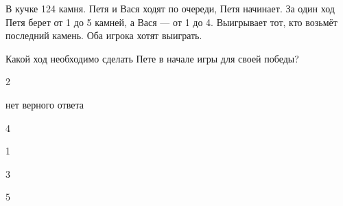 
\begin{question}
В кучке 124 камня. Петя и Вася ходят по очереди, Петя начинает. За один
ход Петя берет от 1 до 5 камней, а Вася --- от 1 до 4. Выигрывает тот,
кто возьмёт последний камень. Оба игрока хотят выиграть.

Какой ход необходимо сделать Пете в начале игры для своей победы?
\begin{answerlist}
  \item 2
  \item нет верного ответа
  \item 4
  \item 1
  \item 3
  \item 5
\end{answerlist}
\end{question}


